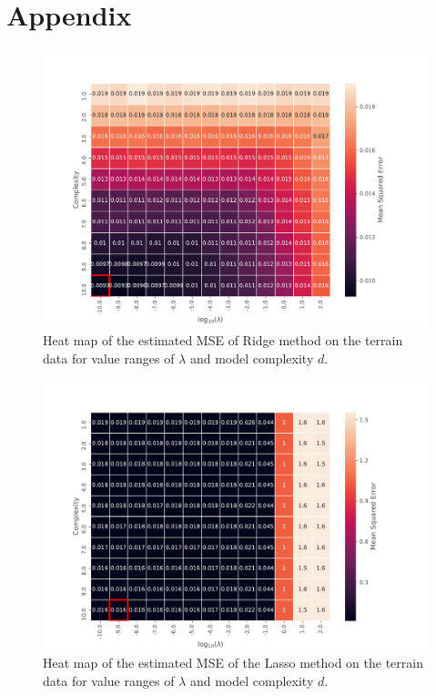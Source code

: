 \section{Appendix}\label{sec:Appendix}


\begin{figure}[!h]
    \centering
    \includegraphics[scale=0.45]{Figures/APPENDIX/min_mse_heatmap_ridge_010.pdf}
    \caption{Heat map of the estimated MSE of Ridge method on the terrain data for value ranges of $\lambda$ and model complexity $d$.}
    \label{fig:appendix_heatmap_ridge}
\end{figure}

\begin{figure}[!h]
    \centering
    \includegraphics[scale=0.45]{Figures/APPENDIX/min_mse_heatmap_lasso_027.pdf}
    \caption{Heat map of the estimated MSE of the Lasso method on the terrain data for value ranges of $\lambda$ and model complexity $d$.}
    \label{fig:appendix_heatmap_lasso}
\end{figure}

